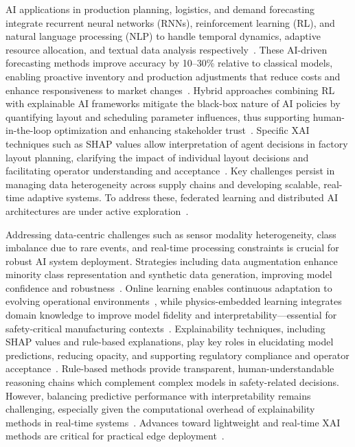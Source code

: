 \documentclass[sigconf]{acmart}
\begin{document}
AI applications in production planning, logistics, and demand forecasting integrate recurrent neural networks (RNNs), reinforcement learning (RL), and natural language processing (NLP) to handle temporal dynamics, adaptive resource allocation, and textual data analysis respectively~\cite{ref40,ref45}. These AI-driven forecasting methods improve accuracy by 10–30\% relative to classical models, enabling proactive inventory and production adjustments that reduce costs and enhance responsiveness to market changes~\cite{ref40}. Hybrid approaches combining RL with explainable AI frameworks mitigate the black-box nature of AI policies by quantifying layout and scheduling parameter influences, thus supporting human-in-the-loop optimization and enhancing stakeholder trust~\cite{ref9,ref45}. Specific XAI techniques such as SHAP values allow interpretation of agent decisions in factory layout planning, clarifying the impact of individual layout decisions and facilitating operator understanding and acceptance~\cite{ref9}. Key challenges persist in managing data heterogeneity across supply chains and developing scalable, real-time adaptive systems. To address these, federated learning and distributed AI architectures are under active exploration~\cite{ref40}.

Addressing data-centric challenges such as sensor modality heterogeneity, class imbalance due to rare events, and real-time processing constraints is crucial for robust AI system deployment. Strategies including data augmentation enhance minority class representation and synthetic data generation, improving model confidence and robustness~\cite{ref29}. Online learning enables continuous adaptation to evolving operational environments~\cite{ref29}, while physics-embedded learning integrates domain knowledge to improve model fidelity and interpretability—essential for safety-critical manufacturing contexts~\cite{ref34}. Explainability techniques, including SHAP values and rule-based explanations, play key roles in elucidating model predictions, reducing opacity, and supporting regulatory compliance and operator acceptance~\cite{ref30,ref38}. Rule-based methods provide transparent, human-understandable reasoning chains which complement complex models in safety-related decisions. However, balancing predictive performance with interpretability remains challenging, especially given the computational overhead of explainability methods in real-time systems~\cite{ref37}. Advances toward lightweight and real-time XAI methods are critical for practical edge deployment~\cite{ref30}.
\end{document}
